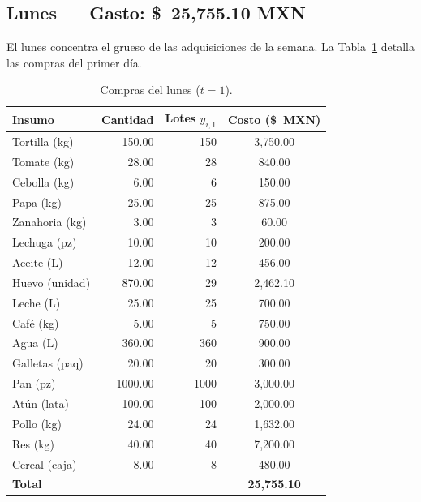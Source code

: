 \documentclass[12pt]{report}
\begin{document}
\subsection{Lunes — Gasto: \$~25{,}755.10 MXN}

El lunes concentra el grueso de las adquisiciones de la semana.
La Tabla~\ref{tab:compras_lunes} detalla las compras del primer día.

\begin{table}[H]
\centering
\renewcommand{\arraystretch}{1.25}
\begin{tabular}{lrrc}
\toprule
\textbf{Insumo} & \textbf{Cantidad} & \textbf{Lotes $y_{i,1}$} & \textbf{Costo (\$~MXN)} \\
\midrule
Tortilla (kg)      & 150.00 & 150   & 3{,}750.00 \\
Tomate (kg)        &  28.00 &  28   &    840.00  \\
Cebolla (kg)       &   6.00 &   6   &    150.00  \\
Papa (kg)          &  25.00 &  25   &    875.00  \\
Zanahoria (kg)     &   3.00 &   3   &     60.00  \\
Lechuga (pz)       &  10.00 &  10   &    200.00  \\
Aceite (L)         &  12.00 &  12   &    456.00  \\
Huevo (unidad)     & 870.00 &  29   & 2{,}462.10 \\
Leche (L)          &  25.00 &  25   &    700.00  \\
Café (kg)          &   5.00 &   5   &    750.00  \\
Agua (L)           & 360.00 & 360   &    900.00  \\
Galletas (paq)     &  20.00 &  20   &    300.00  \\
Pan (pz)           & 1000.00 & 1000 & 3{,}000.00 \\
Atún (lata)        & 100.00 & 100   & 2{,}000.00 \\
Pollo (kg)         &  24.00 &  24   & 1{,}632.00 \\
Res (kg)           &  40.00 &  40   & 7{,}200.00 \\
Cereal (caja)      &   8.00 &   8   &    480.00  \\
\midrule
\textbf{Total}     &        &       & \textbf{25{,}755.10} \\
\bottomrule
\end{tabular}
\caption{Compras del lunes ($t = 1$).}
\label{tab:compras_lunes}
\end{table}
\end{document}
